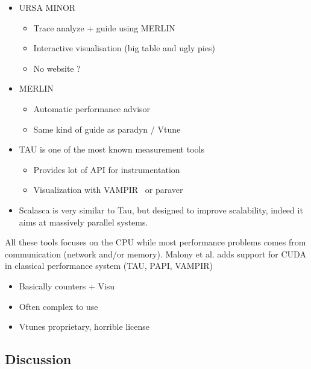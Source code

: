 \begin{itemize}
\begin{itemize}
        \end{itemize}
    \item URSA MINOR \cite{Park00Supporting}
        \begin{itemize}
            \item Trace analyze + guide using MERLIN\cite{Kim01Performance}
            \item Interactive visualisation (big table and ugly pies)
            \item No website ?
        \end{itemize}
    \item MERLIN \cite{Kim01Performance}
        \begin{itemize}
            \item Automatic performance advisor
            \item Same kind of guide as paradyn \cite{Miller95Paradyn} /
                Vtune \cite{Reinders05VTune}
        \end{itemize}
    \item TAU \cite{Shende06Tau} is one of the most known measurement tools
        \begin{itemize}
            \item Provides lot of API for instrumentation
            \item Visualization with
                VAMPIR~\cite{Nagel96VAMPIR} or paraver
        \end{itemize}
    \item Scalasca \cite{Geimer10Scalasca} is very similar to Tau, but
        designed to improve scalability, indeed it aims at massively parallel
        systems.
\end{itemize}

All these tools focuses on the CPU while most performance problems comes from
communication (network and/or memory).
Malony et al. \cite{Malony11Parallel} adds support for CUDA in classical
performance system (TAU, PAPI, VAMPIR)

\begin{itemize}
    \item Basically counters + Visu
    \item Often complex to use
    \item Vtunes proprietary, horrible license
\end{itemize}

\subsection{Discussion}

